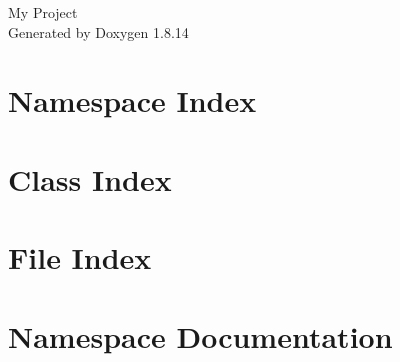 \documentclass[twoside]{book}
\newcommand{\+}{\discretionary{\mbox{\scriptsize$\hookleftarrow$}}{}{}}
\newcommand{\clearemptydoublepage}{%
  \newpage{\pagestyle{empty}\cleardoublepage}%
}
\begin{document}
\hypersetup{pageanchor=false,
             bookmarksnumbered=true,
             pdfencoding=unicode
            }
\begin{titlepage}
\vspace*{7cm}
\begin{center}%
{\Large My Project }\\
\vspace*{1cm}
{\large Generated by Doxygen 1.8.14}\\
\end{center}
\end{titlepage}
\clearemptydoublepage
{}
\tableofcontents
\clearemptydoublepage
{}
\hypersetup{pageanchor=true}

\chapter{Namespace Index}

\chapter{Class Index}

\chapter{File Index}

\chapter{Namespace Documentation}




\end{document}
